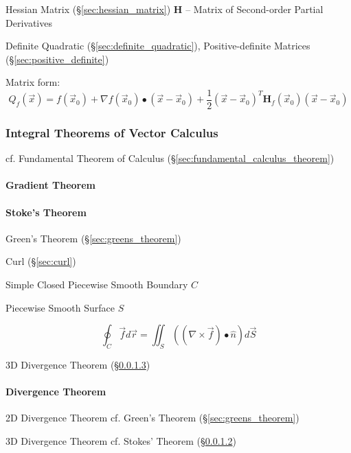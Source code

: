 \fist Hessian Matrix (\S\ref{sec:hessian_matrix}) $\mathbf{H}$ -- Matrix of
Second-order Partial Derivatives

\fist Definite Quadratic (\S\ref{sec:definite_quadratic}), Positive-definite
Matrices (\S\ref{sec:positive_definite})

Matrix form:
\[
  Q_f(\vec{x}) = f(\vec{x}_0) + \nabla{f(\vec{x}_0)}\bullet (\vec{x}-\vec{x}_0)
  + \frac{1}{2}(\vec{x}-\vec{x}_0)^T\mathbf{H}_f(\vec{x}_0)(\vec{x}-\vec{x}_0)
\]



\subsubsection{Integral Theorems of Vector Calculus}
\label{sec:integral_theorems}

cf. Fundamental Theorem of Calculus (\S\ref{sec:fundamental_calculus_theorem})



\paragraph{Gradient Theorem}\label{sec:gradient_theorem}\hfill

\paragraph{Stoke's Theorem}\label{sec:stokes_theorem}\hfill

\fist Green's Theorem (\S\ref{sec:greens_theorem})

Curl (\S\ref{sec:curl})

Simple Closed Piecewise Smooth Boundary $C$

Piecewise Smooth Surface $S$

\[
  \oint_C \vec{f} d\vec{r}
    = \iint_S ((\nabla \times \vec{f}) \bullet \hat{n}) d\vec{S}
\]

\fist 3D Divergence Theorem (\S\ref{sec:divergence_theorem})



\paragraph{Divergence Theorem}\label{sec:divergence_theorem}\hfill

2D Divergence Theorem \fist cf. Green's Theorem (\S\ref{sec:greens_theorem})

3D Divergence Theorem \fist cf. Stokes' Theorem (\S\ref{sec:stokes_theorem})

